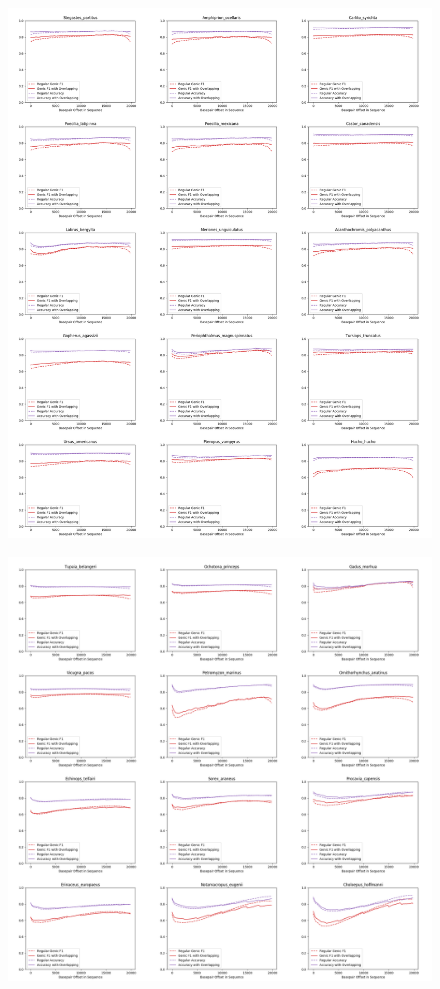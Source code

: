 \documentclass{article}
\begin{document}
\begin{figure}[!h]
\centerline{\includegraphics[width=1.2\textwidth]{images/overlapping/montage_animals12}}
\end{figure}
\begin{figure}[!h]
\centerline{\includegraphics[width=1.2\textwidth]{images/overlapping/montage_animals13}}
\end{figure}
\end{document}
